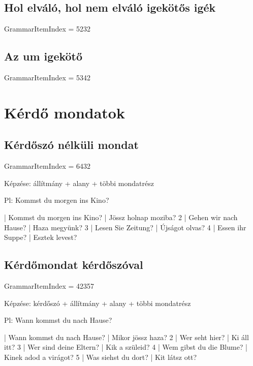 \documentclass{article}
\newenvironment{desc}{\verbatim}{\endverbatim}
\newenvironment{exmp}{\verbatim}{\endverbatim}
\begin{document}
\subsection{Hol elváló, hol nem elváló igekötős igék}

GrammarItemIndex = 5232

\subsection{Az um igekötő}

GrammarItemIndex = 5342

\section{Kérdő mondatok}

\subsection{Kérdőszó nélküli mondat}

GrammarItemIndex = 6432

\begin{desc}
Képzése: állítmány + alany + többi mondatrész

Pl: Kommst du morgen ins Kino?
\end{desc}

\begin{exmp}
1 | Kommst du morgen ins Kino? | Jössz holnap moziba?
2 | Gehen wir nach Hause? | Haza megyünk?
3 | Lesen Sie Zeitung? | Újságot olvas?
4 | Essen ihr Suppe? | Esztek levest?
\end{exmp}

\subsection{Kérdőmondat kérdőszóval}

GrammarItemIndex = 42357

\begin{desc}
Képzése: kérdőszó + állítmány + alany + többi mondatrész

Pl: Wann kommst du nach Hause?
\end{desc}

\begin{exmp}
1 | Wann kommst du nach Hause? | Mikor jössz haza?
2 | Wer seht hier? | Ki áll itt?
3 | Wer sind deine Eltern? | Kik a szüleid?
4 | Wem gibst du die Blume? | Kinek adod a virágot?
5 | Was siehst du dort? | Kit látsz ott?
\end{exmp}
\end{document}
